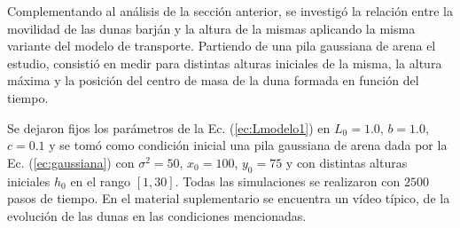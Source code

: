 \documentclass[11pt,twocolumn,twoside]{opticajnl}
\begin{document}
Complementando al análisis de la sección anterior, se investigó la relación entre la movilidad de las dunas barján y la altura de la mismas aplicando la misma variante del modelo de transporte. Partiendo de una pila gaussiana de arena el estudio, consistió en medir para distintas alturas iniciales de la misma, la altura máxima y la posición del centro de masa de la duna formada en función del tiempo. 

Se dejaron fijos los parámetros de la Ec. (\ref{ec:Lmodelo1}) en $L_0=1.0$, $b=1.0$, $c=0.1$ y se tomó como condición inicial una pila gaussiana de arena dada por la Ec. (\ref{ec:gaussiana}) con $\sigma^2=50$, $x_0=100$, $y_0=75$ y con distintas alturas iniciales $h_0$ en el rango  $[1,30]$. Todas las simulaciones se realizaron con $2500$ pasos de tiempo. En el material suplementario \cite{link} se encuentra un vídeo típico, de la evolución de las dunas en las condiciones mencionadas. 
\end{document}
